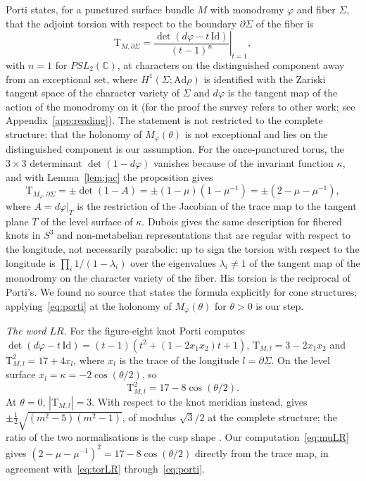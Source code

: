 \documentclass[11pt]{amsart}
\theoremstyle{definition}
\theoremstyle{remark}
\newcommand{\C}{\mathbb{C}}
\begin{document}
Porti \cite[Prop.~5.9]{Porti} states, for a punctured surface bundle $M$ with
monodromy $\varphi$ and fiber $\Sigma$, that the adjoint torsion with respect to the
boundary $\partial\Sigma$ of the fiber is
\[
\mathrm{T}_{M,\partial\Sigma} = \left.\frac{\det(d\varphi - t\,\mathrm{Id})}{(t-1)^n}\right|_{t=1},
\]
with $n = 1$ for $PSL_2(\C)$, at characters on the distinguished component away from
an exceptional set, where $H^1(\Sigma; \mathrm{Ad}\rho)$ is identified with the Zariski
tangent space of the character variety of $\Sigma$ \cite[Thm.~5.8]{Porti} and
$d\varphi$ is the tangent map of the action of the monodromy on it (for the proof the
survey refers to other work; see Appendix~\ref{app:reading}). The statement is not
restricted to the complete structure; that the holonomy of $M_\varphi(\theta)$ is not
exceptional and lies on the distinguished component is our assumption. For the
once-punctured torus, the $3\times3$ determinant $\det(1 - d\varphi)$ vanishes because
of the invariant function $\kappa$, and with Lemma~\ref{lem:jac} the proposition gives
\begin{equation}\label{eq:porti}
\mathrm{T}_{M_\varphi,\partial\Sigma} = \pm\det(1 - A) = \pm(1-\mu)(1-\mu^{-1})
= \pm(2 - \mu - \mu^{-1}),
\end{equation}
where $A = d\varphi|_T$ is the restriction of the Jacobian of the trace map to the
tangent plane $T$ of the level surface of $\kappa$. Dubois \cite[Main Theorem,
(8)]{Dub} gives the same description for fibered knots in $S^3$ and non-metabelian
representations that are regular with respect to the longitude, not necessarily
parabolic: up to sign the torsion with respect to the longitude is
$\prod_i 1/(1-\lambda_i)$ over the eigenvalues $\lambda_i \ne 1$ of the tangent map
of the monodromy on the character variety of the fiber. His torsion is the reciprocal
of Porti's. We found no source that states the formula explicitly for cone
structures; applying~\eqref{eq:porti} at the holonomy of $M_\varphi(\theta)$ for
$\theta > 0$ is our step.

\emph{The word $LR$.} For the figure-eight knot Porti \cite[Section~5.2.1,
(46)--(50)]{Porti} computes $\det(d\varphi - t\,\mathrm{Id}) = (t-1)(t^2 + (1 -
2x_1x_2)t + 1)$, $\mathrm{T}_{M,l} = 3 - 2x_1x_2$ and $\mathrm{T}_{M,l}^2 = 17 + 4x_l$,
where $x_l$ is the trace of the longitude $l = \partial\Sigma$. On the level surface
$x_l = \kappa = -2\cos(\theta/2)$, so
\begin{equation}\label{eq:torLR}
\mathrm{T}_{M,l}^2 = 17 - 8\cos(\theta/2).
\end{equation}
At $\theta = 0$, $|\mathrm{T}_{M,l}| = 3$. With respect to the knot meridian instead,
\cite[(51)]{Porti} gives $\pm\frac12\sqrt{(m^2-5)(m^2-1)}$, of modulus $\sqrt3/2$ at the
complete structure; the ratio of the two normalisations is the cusp shape
\cite[Prop.~5.14]{Porti}. Our computation~\eqref{eq:muLR} gives
$(2 - \mu - \mu^{-1})^2 = 17 - 8\cos(\theta/2)$ directly from the trace map, in
agreement with~\eqref{eq:torLR} through~\eqref{eq:porti}.
\end{document}
